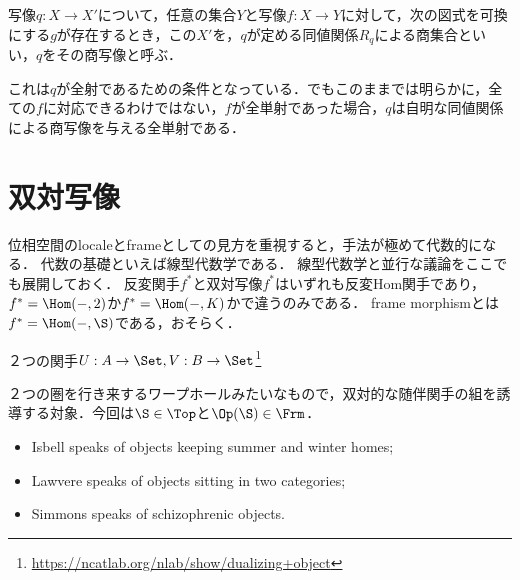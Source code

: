 \documentclass[uplatex,dvipdfmx]{jsreport}
\begin{document}
\begin{definition}
    写像$q:X\to X'$について，任意の集合$Y$と写像$f:X\to Y$に対して，次の図式を可換にする$g$が存在するとき，この$X'$を，$q$が定める同値関係$R_q$による商集合といい，$q$をその商写像と呼ぶ．
    \begin{center}\end{center}
\end{definition}
\begin{remark}
    これは$q$が全射であるための条件となっている．でもこのままでは明らかに，全ての$f$に対応できるわけではない，$f$が全単射であった場合，$q$は自明な同値関係による商写像を与える全単射である．
\end{remark}

\section{双対写像}

\begin{screen}
    位相空間のlocaleとframeとしての見方を重視すると，手法が極めて代数的になる．
    代数の基礎といえば線型代数学である．
    線型代数学と並行な議論をここでも展開しておく．
    反変関手$f^*$と双対写像$f^*$はいずれも反変Hom関手であり，
    $f^*=\Hom(-,2)$か$f^*=\Hom(-,K)$かで違うのみである．
    frame morphismとは$f^*=\Hom(-,\S)$である，おそらく．
\end{screen}

\begin{definition}
    ２つの関手$U:A\to\Set,V:B\to\Set$\footnote{\url{https://ncatlab.org/nlab/show/dualizing+object}}
\end{definition}
\begin{remark}
    ２つの圏を行き来するワープホールみたいなもので，双対的な随伴関手の組を誘導する対象．今回は$\S\in\Top$と$\Op(\S)\in\Frm$．
    \begin{itemize}
        \item Isbell speaks of objects keeping summer and winter homes;
        \item Lawvere speaks of objects sitting in two categories;
        \item Simmons speaks of schizophrenic objects.
    \end{itemize}
\end{remark}
\end{document}
